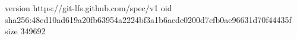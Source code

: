 version https://git-lfs.github.com/spec/v1
oid sha256:48cd10ad619a20fb63954a2224bf3a1b6aede0200d7cfb0ae96631d70f44435f
size 349692

